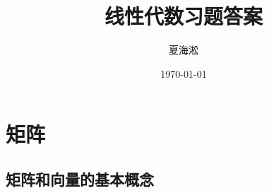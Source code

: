 \documentclass{ctexart}
\author{夏海淞}
\title{线性代数习题答案}
\date{\today}
\begin{document}
\maketitle
\tableofcontents
\section{矩阵}
\subsection{矩阵和向量的基本概念}
\end{document}
